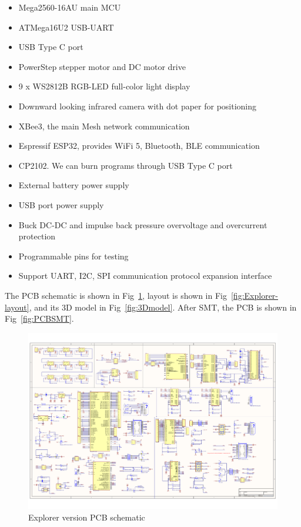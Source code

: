 \documentclass[sigconf]{acmart}
\begin{document}
\begin{itemize}
  \item Mega2560-16AU main MCU
  \item ATMega16U2 USB-UART
  \item USB Type C port
  \item PowerStep stepper motor and DC motor drive
  \item 9 x WS2812B RGB-LED full-color light display
  \item Downward looking infrared camera with dot paper for positioning
  \item XBee3, the main Mesh network communication
  \item Espressif ESP32, provides WiFi 5, Bluetooth, BLE communication
  \item CP2102. We can burn programs through USB Type C port
  \item External battery power supply
  \item USB port power supply
  \item Buck DC-DC and impulse back pressure overvoltage and overcurrent protection
  \item Programmable pins for testing
  \item Support UART, I2C, SPI communication protocol expansion interface
\end{itemize}

The PCB schematic is shown in Fig~\ref{fig:Explorer-schematic}, layout is shown in Fig~\ref{fig:Explorer-layout}, and its 3D model in Fig~\ref{fig:3Dmodel}. After SMT, the PCB is shown in Fig~\ref{fig:PCBSMT}.

\begin{figure}[h]
  \centering
  \includegraphics[width=\linewidth]{Misaka-v1-1.pdf}
  \caption{Explorer version PCB schematic}
  \label{fig:Explorer-schematic}
\end{figure}
\end{document}

